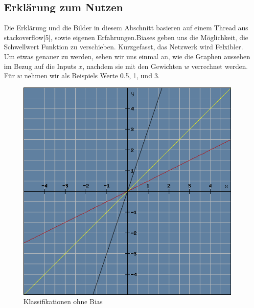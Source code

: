 \documentclass[12pt]{article}
\begin{document}
\subsection{Erklärung zum Nutzen}Die Erklärung und die Bilder in diesem Abschnitt basieren auf einem Thread aus stackoverflow[5], sowie eigenen Erfahrungen.Biases geben uns die Möglichkeit, die Schwellwert Funktion zu verschieben. Kurzgefasst, das Netzwerk wird Felxibler. 
Um etwas genauer zu werden, sehen wir uns einmal an, wie die Graphen aussehen im Bezug auf die Inputs $x$, nachdem sie mit den Gewichten $w$ verrechnet werden. Für $w$ nehmen wir als Beispiels Werte 0.5, 1, und 3.
\begin{figure}[H]
\centering
\includegraphics[scale=0.60]{./Images/Pasted image 20231005144238.png}
\caption{Klassifikationen ohne Bias}
\label{Was kommt hier rein?}
\end{figure}
\end{document}
